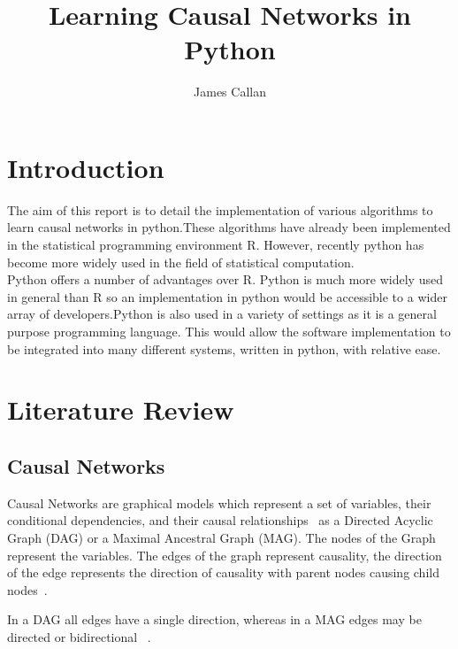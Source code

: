 \documentclass{UoYCSproject}
\begin{document}
\title{Learning Causal Networks in Python}
\author{James Callan}
\MEng
\date{}

\maketitle

\listoffigures
\listoftables

\begin{summary}
\end{summary}
\chapter{Introduction}
The aim of this report is to detail the implementation of various algorithms to learn causal networks in python.These algorithms have already been implemented in the statistical programming environment R. However, recently python has become more widely used in the field of statistical computation.\\

Python offers a number of advantages over R. Python is much more widely used in general than R so an implementation in python would be accessible to a wider array of developers.Python is also used in a variety of settings as it is a general purpose programming language. This would allow the software implementation to be integrated into many different systems, written in python, with relative ease.\\

\chapter{Literature Review}

\section{Causal Networks}

Causal Networks are graphical models which represent a set of variables, their conditional dependencies, and their causal relationships~\parencite{verma1990causal} as a Directed Acyclic Graph (DAG) or a Maximal Ancestral Graph (MAG). The nodes of the Graph represent the variables. The edges of the graph represent causality, the direction of the edge represents the direction of causality with parent nodes causing child nodes~\parencite{verma1990causal}. 

In a DAG all edges have a single direction, whereas in a MAG edges may be directed or bidirectional ~\parencite{zhang2008causal}.
\end{document}
